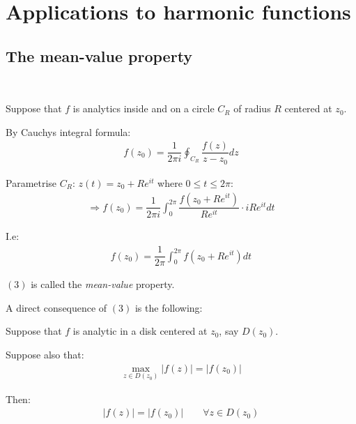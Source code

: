 \section{Applications to harmonic functions}
\par\bigskip
\subsection{The mean-value property}\hfill\\
\par\bigskip
\noindent Suppose that $f$ is analytics inside and on a circle $C_R$ of radius $R$ centered at $z_0$.\par
\noindent By Cauchys integral formula:
\begin{equation*}
  \begin{gathered}
    f(z_0) = \dfrac{1}{2\pi i}\oint_{C_R}\dfrac{f(z)}{z-z_0}dz
  \end{gathered}
\end{equation*}
\par\bigskip
\noindent Parametrise $C_R$: $z(t) = z_0+Re^{it}$ where $0\leq t\leq 2\pi$:
\begin{equation*}
  \begin{gathered}
    \Rightarrow f(z_0) = \dfrac{1}{2\pi i}\int_{0}^{2\pi}\dfrac{f(z_0+Re^{it})}{Re^{it}}\cdot iRe^{it}dt
  \end{gathered}
\end{equation*}\par
\noindent I.e:
\begin{equation}
  \begin{gathered}
    f(z_0) = \dfrac{1}{2\pi}\int_{0}^{2\pi}f(z_0+Re^{it})dt
  \end{gathered}
\end{equation}
\par\bigskip
\noindent $(3)$ is called the \textit{mean-value} property.
\par\bigskip
\noindent A direct consequence of $(3)$  is the following:
\par\bigskip
\begin{lem}[]{}
  Suppose that $f$ is analytic in a disk centered at $z_0$, say $D(z_0)$.\par
  \noindent Suppose also that:
  \begin{equation*}
    \begin{gathered}
      \max_{z\in D(z_0)}\left|f(z)\right| = \left|f(z_0)\right|
    \end{gathered}
  \end{equation*}
  \par\bigskip
  \noindent Then:
  \begin{equation*}
    \begin{gathered}
      \left|f(z)\right| = \left|f(z_0)\right|\qquad\forall z\in D(z_0)
    \end{gathered}
  \end{equation*}
\end{lem}
